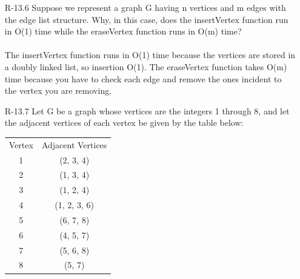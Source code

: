 \begin{itemize}
      \item[R-13.6]  Suppose we represent a graph G having n vertices and m edges with the
            edge list structure. Why, in this case, does the insertVertex function run
            in O(1) time while the eraseVertex function runs in O(m) time? \\
            \answer\\
            The insertVertex function runs in O(1) time because the vertices are stored in a doubly
            linked list, so insertion O(1). The eraseVertex function takes O(m) time because
            you have to check each edge and remove the ones incident to the vertex you are removing.

      \item[R-13.7] Let G be a graph whose vertices are the integers 1 through 8, and let the
            adjacent vertices of each vertex be given by the table below:
            \begin{center}
                  \begin{tabular}{c c}
                        Vertex & Adjacent Vertices \\
                        1      & (2, 3, 4)         \\
                        2      & (1, 3, 4)         \\
                        3      & (1, 2, 4)         \\
                        4      & (1, 2, 3, 6)      \\
                        5      & (6, 7, 8)         \\
                        6      & (4, 5, 7)         \\
                        7      & (5, 6, 8)         \\
                        8      & (5, 7)            \\
                  \end{tabular}


\end{center}
\end{itemize}
